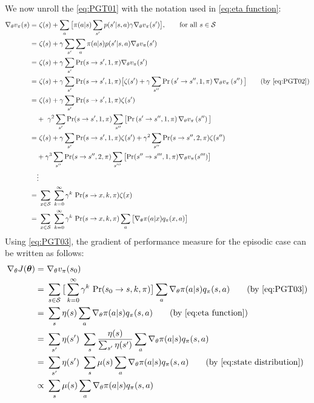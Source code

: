 We now unroll the \autoref{eq:PGT01} with the notation used in \eqref{eq:eta function}:
\begin{align}
    \nabla_\theta v_\pi(s) =& \ \zeta(s) + \sum_a\big[\pi(a|s) \sum_{s'} p(s'|s,a) \gamma \nabla_\theta v_\pi(s') \big], \qquad \text{for all } s\in\mathcal{S} \nonumber\\
    =& \ \zeta(s) + \gamma\sum_{s'}\sum_{a}\pi(a|s) p(s'|s,a) \nabla_\theta v_\pi(s') \nonumber\\
    =& \ \zeta(s) + \gamma\sum_{s'}\text{Pr}(s\rightarrow s',1,\pi) \nabla_\theta v_\pi(s') \label{eq:PGT02}\\
    =& \ \zeta(s) + \gamma\sum_{s'}\text{Pr}(s\rightarrow s',1,\pi) \big[\zeta(s') + \gamma\sum_{s''}\text{Pr}\left(s'\rightarrow s^{\prime\prime},1,\pi\right)\nabla_\theta v_\pi\left(s^{\prime\prime}\right)\big] \tag{by \autoref{eq:PGT02}}\\
    =& \ \zeta(s) + \gamma\sum_{s'}\text{Pr}(s\rightarrow s',1,\pi)\zeta(s')\nonumber\\
    &+ \ \gamma^2\sum_{s'}\text{Pr}(s\rightarrow s',1,\pi)\sum_{s''}\big[\text{Pr}\left(s'\rightarrow s^{\prime\prime},1,\pi\right)\nabla_\theta v_\pi\left(s^{\prime\prime}\right)\big] \nonumber\\
    =& \ \zeta(s) + \gamma\sum_{s'}\text{Pr}(s\rightarrow s',1,\pi)\zeta(s') + \gamma^2\sum_{s''}\text{Pr}(s\rightarrow s'',2,\pi)\zeta(s'')\nonumber\\
    &+ \gamma^3\sum_{s''}\text{Pr}(s\rightarrow s'',2,\pi)\sum_{s'''}\big[\text{Pr}(s''\rightarrow s''',1,\pi)\nabla_\theta v_\pi(s''')\big]\nonumber\\
    &\vdots\nonumber\\
    =& \ \sum_{x\in\mathcal{S}} \ \sum_{k=0}^{\infty}\gamma^{k} \ \text{Pr}(s\rightarrow x, k, \pi)\zeta(x)\nonumber\\
    =& \ \sum_{x\in\mathcal{S}} \ \sum_{k=0}^{\infty}\gamma^{k} \ \text{Pr}(s\rightarrow x, k, \pi)\sum_a\big[ \nabla_\theta \pi(a|x)q_\pi(x,a) \big] \label{eq:PGT03}
\end{align}
Using \autoref{eq:PGT03}, the gradient of performance measure for the episodic case can be written as follows:
\begin{align}
    \nabla_\theta J(\boldsymbol{\theta}) =& \ \nabla_\theta v_\pi(s_0)\nonumber\\
    =& \ \sum_{s\in\mathcal{S}}\big[\sum_{k=0}^{\infty}\gamma^{k} \ \text{Pr}(s_0\rightarrow s, k, \pi)\big]\sum_a \nabla_\theta \pi(a|s)q_\pi(s,a) \tag{by \autoref{eq:PGT03}}\\
    =& \ \sum_s \eta(s) \sum_{a}\nabla_\theta \pi(a|s)q_\pi(s,a)\tag{by \autoref{eq:eta function}}\\
    =& \ \sum_{s'}\eta(s') \ \sum_s \frac{\eta(s)}{\sum_{s'}\eta(s')}\sum_a \nabla_\theta \pi(a|s)q_\pi(s,a)\nonumber\\
    =& \ \sum_{s'}\eta(s') \ \sum_s \mu(s)\sum_a \nabla_\theta \pi(a|s)q_\pi(s,a)\tag{by \autoref{eq:state distribution}}\\
    \propto& \ \sum_s \mu(s)\sum_a \nabla_\theta \pi(a|s)q_\pi(s,a)
\end{align}


